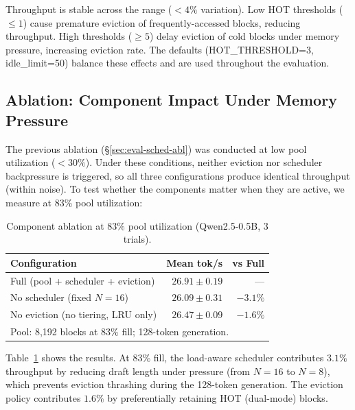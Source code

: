 \documentclass[review]{elsarticle}
\theoremstyle{definition}
\theoremstyle{remark}
\begin{document}
Throughput is stable across the range ($<4\%$ variation). Low HOT
thresholds ($\le 1$) cause premature eviction of frequently-accessed
blocks, reducing throughput. High thresholds ($\ge 5$) delay eviction
of cold blocks under memory pressure, increasing eviction rate.
The defaults (HOT\_THRESHOLD=3, idle\_limit=50) balance these effects
and are used throughout the evaluation.

\subsection{Ablation: Component Impact Under Memory Pressure}
\label{sec:eval-pressure-abl}

The previous ablation (\S\ref{sec:eval-sched-abl}) was conducted at low pool
utilization ($<30\%$). Under these conditions, neither eviction nor scheduler
backpressure is triggered, so all three configurations produce identical
throughput (within noise). To test whether the components matter when they
are active, we measure at 83\% pool utilization:

\begin{table}[t]
\centering
\caption{Component ablation at 83\% pool utilization
(Qwen2.5-0.5B, 3 trials).}
\label{tab:pressure-abl}
\begin{tabular}{lrr}
\toprule
Configuration & Mean tok/s & vs Full \\
\midrule
Full (pool + scheduler + eviction) & $26.91 \pm 0.19$ & --- \\
No scheduler (fixed $N=16$) & $26.09 \pm 0.31$ & $-3.1\%$ \\
No eviction (no tiering, LRU only) & $26.47 \pm 0.09$ & $-1.6\%$ \\
\midrule
\multicolumn{3}{l}{Pool: 8,192 blocks at 83\% fill; 128-token generation.} \\
\end{tabular}
\end{table}

Table~\ref{tab:pressure-abl} shows the results. At 83\% fill, the load-aware
scheduler contributes $3.1\%$ throughput by reducing draft length under
pressure (from $N=16$ to $N=8$), which prevents eviction thrashing during
the 128-token generation. The eviction policy contributes $1.6\%$ by
preferentially retaining HOT (dual-mode) blocks.
\end{document}
